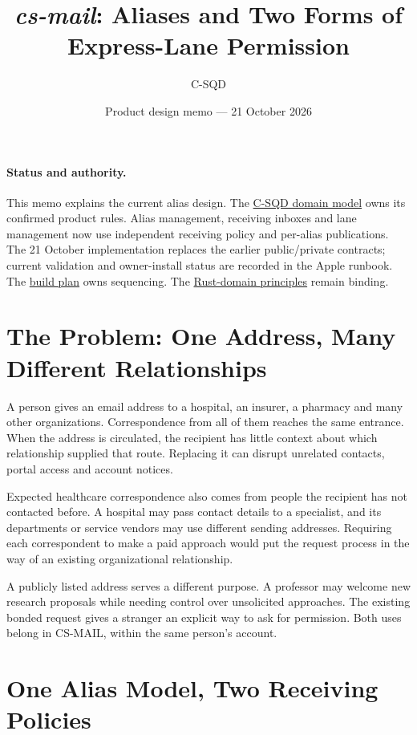 \documentclass[11pt]{article}
\title{\textit{cs-mail}: Aliases and Two Forms of Express-Lane Permission}
\author{C-SQD}
\date{Product design memo --- 21 October 2026}
\begin{document}
\maketitle

\paragraph{Status and authority.}
This memo explains the current alias design. The
\href{DOMAIN_MODEL.md}{C-SQD domain model} owns its confirmed product rules.
Alias management, receiving inboxes and lane management now use independent
receiving policy and per-alias publications. The 21 October implementation replaces
the earlier public/private contracts; current validation and owner-install status
are recorded in the Apple runbook. The
\href{cs_mail_build_plan.tex}{build plan} owns sequencing. The
\href{docs/rust-domain-principles.md}{Rust-domain principles} remain binding.

\section{The Problem: One Address, Many Different Relationships}

A person gives an email address to a hospital, an insurer, a pharmacy and many
other organizations. Correspondence from all of them reaches the same entrance.
When the address is circulated, the recipient has little context about which
relationship supplied that route. Replacing it can disrupt unrelated contacts,
portal access and account notices.

Expected healthcare correspondence also comes from people the recipient has not
contacted before. A hospital may pass contact details to a specialist, and its
departments or service vendors may use different sending addresses. Requiring
each correspondent to make a paid approach would put the request process in the
way of an existing organizational relationship.

A publicly listed address serves a different purpose. A professor may welcome
new research proposals while needing control over unsolicited approaches. The
existing bonded request gives a stranger an explicit way to ask for permission.
Both uses belong in CS-MAIL, within the same person's account.

\section{One Alias Model, Two Receiving Policies}
\end{document}
